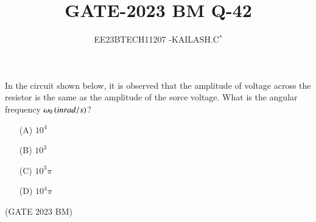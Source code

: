 \documentclass[journal,12pt,twocolumn]{IEEEtran}
\theoremstyle{remark}
\begin{document}

\vspace{3cm}

\title{GATE-2023 BM Q-42}
\author{EE23BTECH11207 -KAILASH.C$^{*}$%
}
\maketitle
\newpage
\bigskip

\renewcommand{\thefigure}{\theenumi}
\renewcommand{\thetable}{\theenumi}
In the circuit shown below, it is observed that the amplitude of voltage across the resistor is the same as the amplitude of the sorce voltage. What is the angular frequency $\omega_0\left(in rad/s\right)$?

\begin{enumerate}
    \item[(A)] $10^4$\\
    \item[(B)] $10^3$\\
    \item[(C)] $10^3\pi$\\
    \item[(D)] $10^4\pi$  
\end{enumerate} \hfill(GATE 2023 BM)
\solution
\fi
\end{document}
